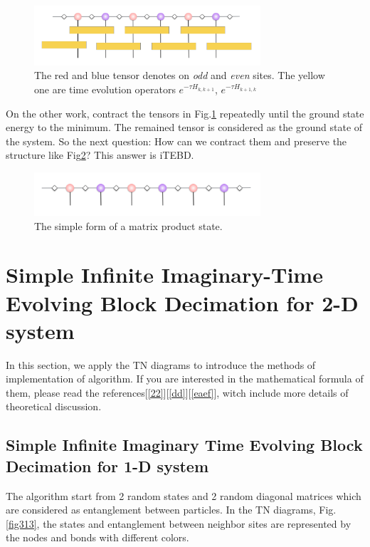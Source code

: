 \begin{figure}[ht]
	\centering
	\includegraphics[width=0.75\textwidth]{figures/fig312.png}
	\caption[The picture of the main idea of itebd.]{The red and blue tensor denotes on \textit{odd} and \textit{even} sites. The yellow one are time evolution operators $e^{-\tau H_{k,k+1}}$, $e^{-\tau H_{k+1,k}}$}
	\label{fig312}
\end{figure}

On the other work, contract the tensors in Fig.\ref{fig312} repeatedly until the ground state energy to the minimum. The remained tensor is considered as the ground state of the system. So the next question: How can we contract them and preserve the structure like Fig{\ref{fig311}}? This answer is iTEBD.

\begin{figure}[ht]
	\centering
	\includegraphics[width=0.75\textwidth]{figures/fig311.png}
	\caption[The picture of matrix product states]{The simple form of a matrix product state.}
	\label{fig311}
\end{figure}

\section{Simple Infinite Imaginary-Time Evolving Block Decimation for 2-D system}
In this section, we apply the TN diagrams to introduce the methods of implementation of algorithm. If you are interested in the mathematical formula of them, please read the references[\ref{22}][\ref{dd}][\ref{eaef}], witch include more details of theoretical discussion.

\label{itebd}
\subsection{Simple Infinite Imaginary Time Evolving Block Decimation for 1-D system}

The algorithm start from 2 random states and 2 random diagonal matrices which are considered as entanglement between particles. In the TN diagrams, Fig.\ref{fig313}, the states and entanglement between neighbor sites are represented by the nodes and bonds with different colors.

